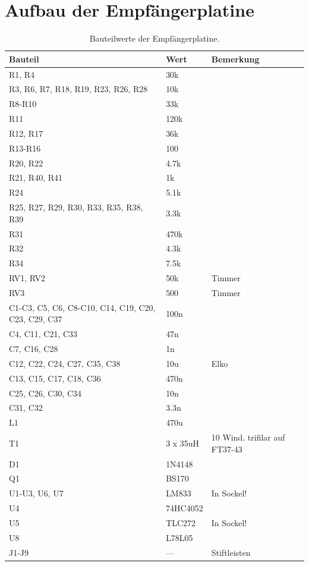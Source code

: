 \documentclass[10pt, a4paper]{paper}
\begin{document}
\section{Aufbau der Empfängerplatine} \label{sec:rx}
\begin{table}
 \begin{tabular}{|p{3.5cm}|p{1.5cm}|p{2cm}|} \hline 
 Bauteil & Wert & Bemerkung \\ \hline
 R1, R4 & 30k & \\
 R3, R6, R7, R18, R19, R23, R26, R28 & 10k & \\
 R8-R10 & 33k & \\
 R11 & 120k & \\
 R12, R17 & 36k & \\
 R13-R16 & 100 & \\
 R20, R22 & 4.7k & \\
 R21, R40, R41 & 1k & \\
 R24 & 5.1k & \\
 R25, R27, R29, R30, R33, R35, R38, R39 & 3.3k & \\
 R31 & 470k & \\
 R32 & 4.3k & \\
 R34 & 7.5k & \\
 RV1, RV2 & 50k & Timmer\\
 RV3 & 500 & Timmer \\

 C1-C3, C5, C6, C8-C10, C14, C19, C20, C23, C29, C37 & 100n & \\
 C4, C11, C21, C33 & 47n & \\
 C7, C16, C28 & 1n & \\
 C12, C22, C24, C27, C35, C38 & 10u & Elko \\
 C13, C15, C17, C18, C36 & 470n & \\
 C25, C26, C30, C34 & 10n & \\
 C31, C32 & 3.3n & \\

 L1 & 470u & \\
 T1 & 3 x 35uH & 10 Wind. trifilar auf FT37-43 \\

 D1 & 1N4148 & \\ 
 Q1 & BS170 & \\

 U1-U3, U6, U7 & LM833 & In Sockel! \\
 U4 & 74HC4052 & \\
 U5 & TLC272 & In Sockel! \\
 U8 & L78L05 & \\

 J1-J9 & --- & Stiftleisten \\ \hline
 \end{tabular}
 \caption{Bauteilwerte der Empfängerplatine.}
\end{table}
\end{document}
